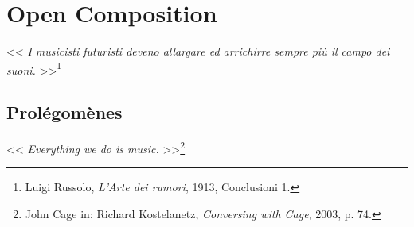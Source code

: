 \chapter*{Open Composition}


 << \textit{I musicisti futuristi deveno allargare ed arrichirre sempre pi\`{u} il campo dei suoni.}  >>\footnote{Luigi Russolo, \textit{L'Arte dei rumori}, 1913, Conclusioni 1.} 

\section*{Prol\'{e}gom\`{e}nes}

\thispagestyle{empty}

<< \textit{Everything we do is music.} >>\footnote{John Cage in: Richard Kostelanetz, \textit{Conversing with Cage}, 2003, p. 74.}

\bigskip


\renewcommand{\labelenumii}{\arabic{enumi}.\arabic{enumii}.}

